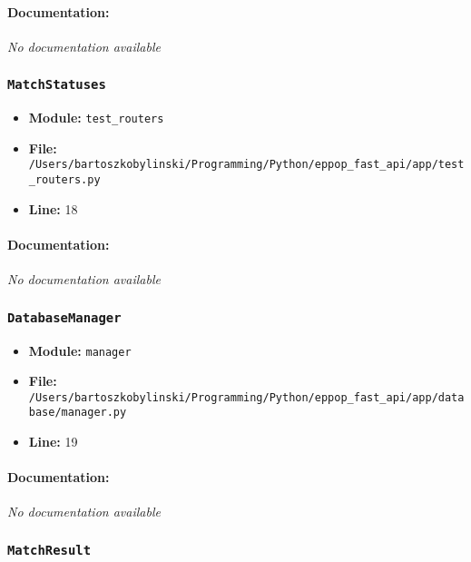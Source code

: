 \documentclass[11pt,a4paper]{article}
\begin{document}
\paragraph{Documentation:} \textit{No documentation available}


\vspace{1em}
\subsubsection{\texttt{MatchStatuses}}

\begin{itemize}
    \item \textbf{Module:} \texttt{test\_routers}
    \item \textbf{File:} \texttt{/Users/bartoszkobylinski/Programming/Python/eppop\_fast\_api/app/test\_routers.py}
    \item \textbf{Line:} 18
\end{itemize}

\paragraph{Documentation:} \textit{No documentation available}


\vspace{1em}
\subsubsection{\texttt{DatabaseManager}}

\begin{itemize}
    \item \textbf{Module:} \texttt{manager}
    \item \textbf{File:} \texttt{/Users/bartoszkobylinski/Programming/Python/eppop\_fast\_api/app/database/manager.py}
    \item \textbf{Line:} 19
\end{itemize}

\paragraph{Documentation:} \textit{No documentation available}


\vspace{1em}
\subsubsection{\texttt{MatchResult}}
\end{document}
